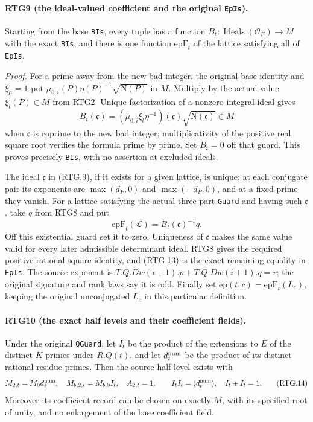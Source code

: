 \paragraph{RTG9 (the ideal-valued coefficient and the original \texttt{EpIs}).}
\label{claim:RTG9}
Starting from the base \texttt{BIs}, every tuple has a function
$B_t:\operatorname{Ideals}(\mathcal O_E)\to M$ with the exact
\texttt{BIs}; and there is one function $\mathrm{epF}_t$ of the lattice
satisfying all of \texttt{EpIs}.

\emph{Proof.}
For a prime away from the new bad integer, the original base identity
and $\xi_\mu=1$ put
$\mu_{0,i}(P)\eta(P)^{-1}\sqrt{\mathrm N(P)}$ in $M$.
Multiply by the actual value $\xi_t(P)\in M$ from RTG2.  Unique
factorization of a nonzero integral ideal gives
\[
 B_t(\mathfrak c)=
  (\mu_{0,i}\xi_t\eta^{-1})(\mathfrak c)
                   \sqrt{\mathrm N(\mathfrak c)}\in M
                                                               \tag{RTG.12}
\]
when $\mathfrak c$ is coprime to the new bad integer; multiplicativity
of the positive real square root verifies the formula prime by prime.
Set $B_t=0$ off that guard.  This proves precisely \texttt{BIs}, with
no assertion at excluded ideals.

The ideal $\mathfrak c$ in (RTG.9), if it exists for a given lattice,
is unique: at each conjugate pair its exponents are
$\max(d_P,0)$ and $\max(-d_P,0)$, and at a fixed prime they vanish.
For a lattice satisfying the actual three-part \texttt{Guard} and
having such $\mathfrak c$, take $q$ from RTG8 and put
\[
 \mathrm{epF}_t(\mathcal L)=B_t(\mathfrak c)^{-1}q.
                                                               \tag{RTG.13}
\]
Off this existential guard set it to zero.  Uniqueness of $\mathfrak c$
makes the same value valid for every later admissible determinant ideal.
RTG8 gives the required positive rational square identity, and
(RTG.13) is the exact remaining equality in \texttt{EpIs}.
The source exponent is $T.Q.Dw(i+1).p+T.Q.Dw(i+1).q=r$;
the original signature and rank laws say it is odd.  Finally set
$\mathrm{ep}(t,c)=\mathrm{epF}_t(L_c)$, keeping the original
unconjugated $L_c$ in this particular definition.

\paragraph{RTG10 (the exact half levels and their coefficient fields).}
\label{claim:RTG10}
Under the original \texttt{QGuard}, let $I_t$ be the product of the
extensions to $E$ of the distinct $K$-primes under $R.Q(t)$, and let
$d_t^{\rm num}$ be the product of its distinct rational residue primes.
Then the source half level exists with
\[
 M_{2,t}=M_0d_t^{\rm num},\quad
 M_{b,2,t}=M_{b,0}I_t,\quad A_{2,t}=1,
 \qquad I_t\bar I_t=(d_t^{\rm num}),\quad I_t+\bar I_t=1.
                                                               \tag{RTG.14}
\]
Moreover its coefficient record can be chosen on exactly $M$, with
its specified root of unity, and no enlargement of the base coefficient
field.

